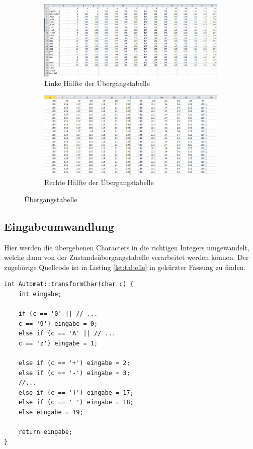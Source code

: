 \documentclass[a4paper,11pt]{report}
\begin{document}
\begin{figure}[p!]
	\centering
	\begin{subfigure}[b]{.99\textwidth}
		\centering
		\includegraphics[width=.98\textwidth]{bilder/tabelle-links}
		\caption{Linke Hälfte der Übergangstabelle}
		\label{fig:tabelle_links}
	\end{subfigure}
	\par \bigskip
	\begin{subfigure}[b]{.99\textwidth}
		\centering
		\includegraphics[width=.98\textwidth]{bilder/tabelle-rechts}
		\caption{Rechte Hälfte der Übergangstabelle}
		\label{fig:tabelle_rechts}
	\end{subfigure}
	\caption{Übergangstabelle}
	\label{fig:tabelle}
\end{figure}

\subsection{Eingabeumwandlung}
Hier werden die übergebenen Characters in die richtigen Integers umgewandelt, welche dann von der Zustandsübergangstabelle verarbeitet werden können.
Der zugehörige Quellcode ist in Listing \ref{lst:tabelle} in gekürzter Fassung zu finden.

\begin{lstlisting}[caption=Übergangstabelle, label=lst:tabelle]
int Automat::transformChar(char c) {
	int eingabe;

	if (c == '0' || // ...
	c == '9') eingabe = 0;
	else if (c == 'A' || // ...
	c == 'z') eingabe = 1;

	else if (c == '+') eingabe = 2;
	else if (c == '-') eingabe = 3;
	//...
	else if (c == ']') eingabe = 17;
	else if (c == ' ') eingabe = 18;
	else eingabe = 19;

	return eingabe;
}
\end{lstlisting}
\end{document}
